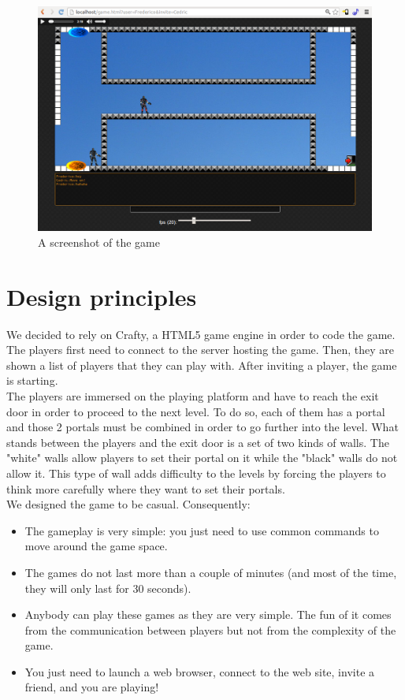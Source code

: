 \documentclass{chi-ext}
\begin{document}
\begin{figure}
\hspace*{-0.4\columnwidth}%
\parbox{1.4\columnwidth}{
  \centering
  \includegraphics[width=1.4\columnwidth]{game.png}
  \caption{A screenshot of the game}
  \label{fig:game}
}
\end{figure}

\section{Design principles}
We decided to rely on Crafty, a HTML5 game engine in order to code the game. The players first need to connect to the server hosting the game. Then, they are shown a list of players that they can play with. After inviting a player, the game is starting.\\
The players are immersed on the playing platform and have to reach the exit door in order to proceed to the next level. To do so, each of them has a portal and those 2 portals must be combined in order to go further into the level. What stands between the players and the exit door is a set of two kinds of walls. The "white" walls allow players to set their portal on it while the "black" walls do not allow it. This type of wall adds difficulty to the levels by forcing the players to think more carefully where they want to set their portals.\\
We designed the game to be casual. Consequently:\\
\begin{itemize}
\item The gameplay is very simple: you just need to use common commands to move around the game space.
\item The games do not last more than a couple of minutes (and most of the time, they will only last for 30 seconds).
\item Anybody can play these games as they are very simple. The fun of it comes from the communication between players but not from the complexity of the game.
\item You just need to launch a web browser, connect to the web site, invite a friend, and you are playing!
\end{itemize}
\end{document}
